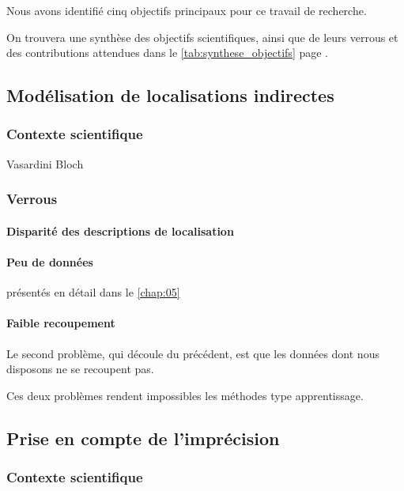 Nous avons identifié cinq objectifs principaux pour ce travail de
recherche.

On trouvera une synthèse des objectifs scientifiques, ainsi que de
leurs verrous et des contributions attendues dans le
\autoref{tab:synthese_objectifs} page
\pageref{tab:synthese_objectifs}.



\subsection{Modélisation de localisations indirectes}
\label{subsec:2-1-1}


\subsubsection{Contexte scientifique}

Vasardini
Bloch

\subsubsection{Verrous}

\paragraph{Disparité des descriptions de localisation}

\paragraph{Peu de données}

présentés en détail dans le \autoref{chap:05}

\paragraph{Faible recoupement}

Le second problème, qui découle du précédent, est que les données
dont nous disposons ne se recoupent pas.

Ces deux problèmes rendent impossibles les méthodes type
apprentissage.

\subsection{Prise en compte de l'imprécision}
\label{subsec:2-1-2}

\subsubsection{Contexte scientifique}

